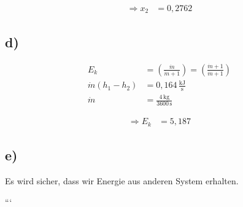 \begin{align*}
    \Rightarrow x_2 &= 0,2762
\end{align*}

\subsection*{d)}
\begin{align*}
    E_k &= \left( \frac{\dot{m}}{\dot{m} + 1} \right) = \left( \frac{\dot{m} + 1}{\dot{m} + 1} \right) \\
    \dot{m} \left( h_1 - h_2 \right) &= 0,164 \, \frac{\text{kJ}}{\text{s}} \\
    \dot{m} &= \frac{4 \, \text{kg}}{3600 \, \text{s}}
\end{align*}

\begin{align*}
    \Rightarrow E_k &= 5,187
\end{align*}

\subsection*{e)}
Es wird sicher, dass wir Energie aus anderen System erhalten.

```